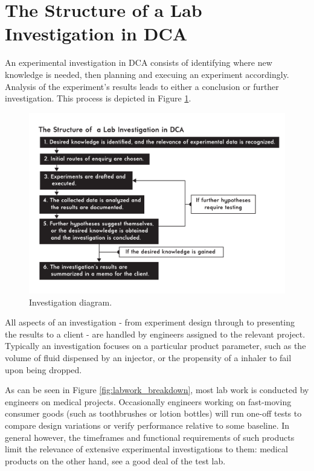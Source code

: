 \documentclass[11pt,a4paper,article]{memoir} %
\newlength\drop
\begin{document}
\section{The Structure of a Lab Investigation in DCA}
An experimental investigation in DCA consists of identifying where new knowledge is needed, then planning and execuing an experiment accordingly. Analysis of the experiment's results leads to either a conclusion or further investigation. This process is depicted in Figure \ref{fig:investigation_diagram}.
\begin{figure}[h!]
\centering
\includegraphics[width=1.2\textwidth]{Lab_Investigation_Diagram.pdf}
\caption{Investigation diagram.}
\label{fig:investigation_diagram}
\end{figure}
\par
All aspects of an investigation - from experiment design through to presenting the results to a client - are handled by engineers assigned to the relevant project. Typically an investigation focuses on a particular product parameter, such as the volume of fluid dispensed by an injector, or the propensity of a inhaler to fail upon being dropped. 
\par
As can be seen in Figure \ref{fig:labwork_breakdown}, most lab work is conducted by engineers on medical projects.
Occasionally engineers working on fast-moving consumer goods (such as toothbrushes or lotion bottles) will run one-off tests to compare design variations or verify performance relative to some baseline. In general however, the timeframes and functional requirements of such products limit the relevance of extensive experimental investigations to them: medical products on the other hand, see a good deal of the test lab.
\end{document}
